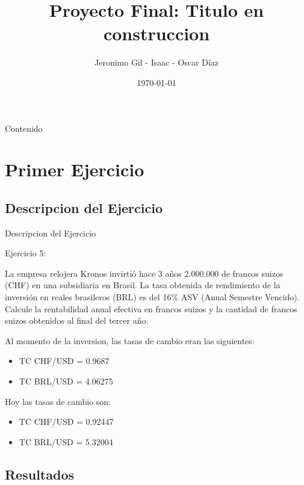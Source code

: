 \documentclass[10pt]{beamer}
\title[Grupo 2]{Proyecto Final: Titulo en construccion}
\author{Jeronimo Gil - Isaac - Oscar Díaz}
\institute{Universidad EAFIT}
\date{\today}
\begin{document}
\begin{frame}
\titlepage
\end{frame}

\begin{frame}{Contenido}
\tableofcontents
\end{frame}


\section{Primer Ejercicio}

\subsection{Descripcion del Ejercicio}
\begin{frame}{Descripcion del Ejercicio}

Ejercicio 5:

La empresa relojera Kronos invirtió hace 3 años 2.000.000 de francos suizos (CHF) en una subsidiaria en Brasil. La tasa obtenida de rendimiento de la inversión en reales brasileros (BRL) es del 16\(\%\) ASV (Anual Semestre Vencido). Calcule la rentabilidad anual efectiva en francos suizos y la cantidad de francos suizos obtenidos al final del tercer año.

Al momento de la inversion, las tasas de cambio eran las siguientes:
\begin{itemize}
    \item TC CHF/USD = 0.9687 

    \item TC BRL/USD = 4.06275
\end{itemize}

Hoy las tasas de cambio son:

\begin{itemize}
    \item TC CHF/USD = 0.92447 

    \item TC BRL/USD = 5.32004
\end{itemize}

\end{frame}

\subsection{Resultados}
\end{document}
